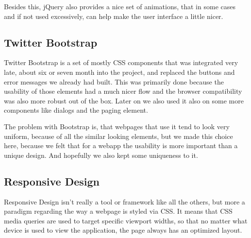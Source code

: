 Besides this, jQuery also provides a nice set of animations, that in some cases and if not used excessively, can help make the user interface a little nicer.

\subsection{Twitter Bootstrap}

Twitter Bootstrap is a set of mostly CSS components that was integrated very late, about six or seven month into the project, and replaced the buttons and error messages we already had built. This was primarily done because the usability of those elements had a much nicer flow and the browser compatibility was also more robust out of the box.
Later on we also used it also on some more components like dialogs and the paging element.

The problem with Bootstrap is, that webpages that use it tend to look very uniform, because of all the similar looking elements, but we made this choice here, because we felt that for a webapp the usability is more important than a unique design. And hopefully we also kept some uniqueness to it.

\subsection{Responsive Design}

Responsive Design isn't really a tool or framework like all the others, but more a paradigm regarding the way a webpage is styled via CSS. It means that CSS media queries are used to target specific viewport widths, so that no matter what device is used to view the application, the page always has an optimized layout.